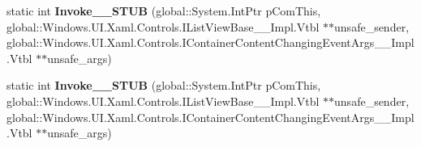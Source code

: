 \begin{DoxyCompactItemize}
\mbox{\label{struct_windows_1_1_foundation_1_1_typed_event_handler___a___windows___u_i___xaml___controls___libdb9ee787e603cdc08b3e175469ff6f2_aa3d73018409978b40173eabb629a9497}} 
static int {\bfseries Invoke\+\_\+\+\_\+\+S\+T\+UB} (global\+::\+System.\+Int\+Ptr p\+Com\+This, global\+::\+Windows.\+U\+I.\+Xaml.\+Controls.\+I\+List\+View\+Base\+\_\+\+\_\+\+Impl.\+Vtbl $\ast$$\ast$unsafe\+\_\+sender, global\+::\+Windows.\+U\+I.\+Xaml.\+Controls.\+I\+Container\+Content\+Changing\+Event\+Args\+\_\+\+\_\+\+Impl.\+Vtbl $\ast$$\ast$unsafe\+\_\+args)
\item 
\mbox{\label{struct_windows_1_1_foundation_1_1_typed_event_handler___a___windows___u_i___xaml___controls___libdb9ee787e603cdc08b3e175469ff6f2_aa3d73018409978b40173eabb629a9497}} 
static int {\bfseries Invoke\+\_\+\+\_\+\+S\+T\+UB} (global\+::\+System.\+Int\+Ptr p\+Com\+This, global\+::\+Windows.\+U\+I.\+Xaml.\+Controls.\+I\+List\+View\+Base\+\_\+\+\_\+\+Impl.\+Vtbl $\ast$$\ast$unsafe\+\_\+sender, global\+::\+Windows.\+U\+I.\+Xaml.\+Controls.\+I\+Container\+Content\+Changing\+Event\+Args\+\_\+\+\_\+\+Impl.\+Vtbl $\ast$$\ast$unsafe\+\_\+args)
\end{DoxyCompactItemize}
